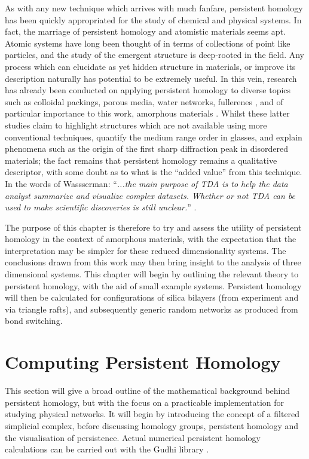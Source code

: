 As with any new technique which arrives with much fanfare, persistent homology has been quickly appropriated for the study of chemical and physical systems.
In fact, the marriage of persistent homology and atomistic materials seems apt.
Atomic systems have long been thought of in terms of collections of point like particles, and the study of the emergent structure is deep\--rooted in the field.
Any process which can elucidate as yet hidden structure in materials, or improve its description naturally has potential to be extremely useful.
In this vein, research has already been conducted on applying persistent homology to diverse topics such as colloidal packings, porous media, water networks, fullerenes \cite{Carter2018,Robins2017,Jiang2018,Steinberg2019,Xia2015}, and of particular importance to this work, amorphous materials \cite{Hiraoka2016,Onodera2019,Nakamura2015,Gutierrez2019}.
Whilst these latter studies claim to highlight structures which are not available using more conventional techniques, quantify the medium range order in glasses, and explain phenomena such as the origin of the first sharp diffraction peak in disordered materials; the fact remains that persistent homology remains a qualitative descriptor, with some doubt as to what is the ``added value'' from this technique. 
In the words of Wassserman: ``\textit{...the main purpose of TDA is to help the data analyst summarize and visualize
complex datasets. Whether or not TDA can be used to make scientific discoveries is still unclear.}'' \cite{Wasserman2018}.

The purpose of this chapter is therefore to try and assess the utility of persistent homology in the context of \td{} amorphous materials, with the expectation that the interpretation may be simpler for these reduced dimensionality systems.
The conclusions drawn from this work may then bring insight to the analysis of three dimensional systems.
This chapter will begin by outlining the relevant theory to persistent homology, with the aid of small example systems.
Persistent homology will then be calculated for configurations of silica bilayers (from experiment and via triangle rafts), and subsequently generic random networks as produced from bond switching.

\section{Computing Persistent Homology}

This section will give a broad outline of the mathematical background behind persistent homology, but with the focus on a practicable implementation for studying physical \td{} networks.
It will begin by introducing the concept of a filtered simplicial complex, before discussing homology groups, persistent homology and the visualisation of persistence.
Actual numerical persistent homology calculations can be carried out with the Gudhi library \cite{gudhi}.

